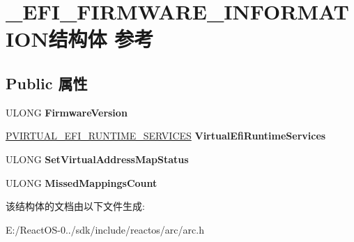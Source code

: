 \hypertarget{struct___e_f_i___f_i_r_m_w_a_r_e___i_n_f_o_r_m_a_t_i_o_n}{}\section{\+\_\+\+E\+F\+I\+\_\+\+F\+I\+R\+M\+W\+A\+R\+E\+\_\+\+I\+N\+F\+O\+R\+M\+A\+T\+I\+O\+N结构体 参考}
\label{struct___e_f_i___f_i_r_m_w_a_r_e___i_n_f_o_r_m_a_t_i_o_n}
\subsection*{Public 属性}
\begin{DoxyCompactItemize}
\item 
\mbox{\label{struct___e_f_i___f_i_r_m_w_a_r_e___i_n_f_o_r_m_a_t_i_o_n_ae9ec5bf250247087f65b3ac284ed2b73}} 
U\+L\+O\+NG {\bfseries Firmware\+Version}
\item 
\mbox{\label{struct___e_f_i___f_i_r_m_w_a_r_e___i_n_f_o_r_m_a_t_i_o_n_acb765eaf96ba006ea8a3455acddecc00}} 
\hyperlink{struct___v_i_r_t_u_a_l___e_f_i___r_u_n_t_i_m_e___s_e_r_v_i_c_e_s}{P\+V\+I\+R\+T\+U\+A\+L\+\_\+\+E\+F\+I\+\_\+\+R\+U\+N\+T\+I\+M\+E\+\_\+\+S\+E\+R\+V\+I\+C\+ES} {\bfseries Virtual\+Efi\+Runtime\+Services}
\item 
\mbox{\label{struct___e_f_i___f_i_r_m_w_a_r_e___i_n_f_o_r_m_a_t_i_o_n_a2be3d23456ea178e3b035c412e3f1534}} 
U\+L\+O\+NG {\bfseries Set\+Virtual\+Address\+Map\+Status}
\item 
\mbox{\label{struct___e_f_i___f_i_r_m_w_a_r_e___i_n_f_o_r_m_a_t_i_o_n_a96a99e1bb83caaf673f27af2c17f5a21}} 
U\+L\+O\+NG {\bfseries Missed\+Mappings\+Count}
\end{DoxyCompactItemize}


该结构体的文档由以下文件生成\+:\begin{DoxyCompactItemize}
\item 
E\+:/\+React\+O\+S-\/0../sdk/include/reactos/arc/arc.\+h\end{DoxyCompactItemize}
